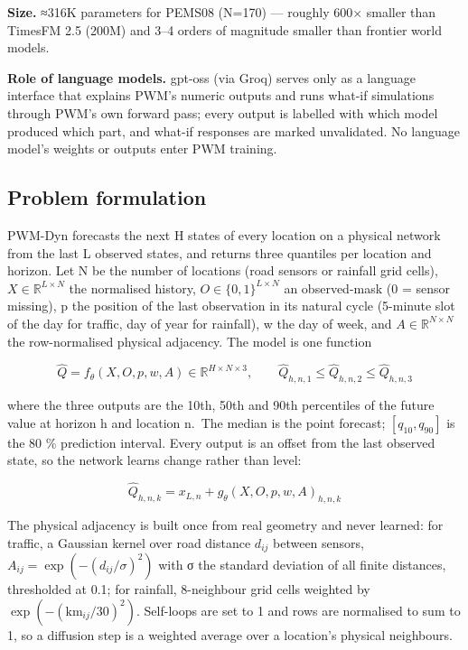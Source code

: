 \documentclass[
  10pt,
]{article}
\begin{document}
\textbf{Size.} ≈316K parameters for PEMS08 (N=170) --- roughly 600×
smaller than TimesFM 2.5 (200M) and 3--4 orders of magnitude smaller
than frontier world models.

\textbf{Role of language models.} gpt-oss (via Groq) serves only as a
language interface that explains PWM's numeric outputs and runs what-if
simulations through PWM's own forward pass; every output is labelled
with which model produced which part, and what-if responses are marked
unvalidated. No language model's weights or outputs enter PWM training.

\subsection{Problem formulation}

PWM-Dyn forecasts the next H states of every location on a physical
network from the last L observed states, and returns three quantiles per
location and horizon. Let N be the number of locations (road sensors or
rainfall grid cells), \(X \in \mathbb{R}^{L \times N}\) the normalised
history, \(O \in \{0,1\}^{L \times N}\) an observed-mask (0 = sensor
missing), p the position of the last observation in its natural cycle
(5-minute slot of the day for traffic, day of year for rainfall), w the
day of week, and \(A \in \mathbb{R}^{N \times N}\) the row-normalised
physical adjacency. The model is one function

\[\hat{Q} = f_\theta(X, O, p, w, A) \in \mathbb{R}^{H \times N \times 3}, \qquad \hat{Q}_{h,n,1} \le \hat{Q}_{h,n,2} \le \hat{Q}_{h,n,3}\]

where the three outputs are the 10th, 50th and 90th percentiles of the
future value at horizon h and location n.~The median is the point
forecast; \([q_{10}, q_{90}]\) is the 80 \% prediction interval. Every
output is an offset from the last observed state, so the network learns
change rather than level:

\[\hat{Q}_{h,n,k} = x_{L,n} + g_\theta(X, O, p, w, A)_{h,n,k}\]

The physical adjacency is built once from real geometry and never
learned: for traffic, a Gaussian kernel over road distance \(d_{ij}\)
between sensors, \(A_{ij} = \exp(-(d_{ij}/\sigma)^2)\) with σ the
standard deviation of all finite distances, thresholded at 0.1; for
rainfall, 8-neighbour grid cells weighted by
\(\exp(-(\mathrm{km}_{ij}/30)^2)\). Self-loops are set to 1 and rows are
normalised to sum to 1, so a diffusion step is a weighted average over a
location's physical neighbours.
\end{document}
